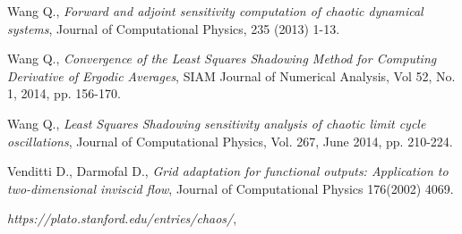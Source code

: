 \documentclass[12pt, twoside]{book}
\begin{document}
\begin{thebibliography}{99}
 Wang Q.,
\emph{Forward and adjoint sensitivity computation of chaotic dynamical systems},
Journal of Computational Physics, 235 (2013) 1-13.

 Wang Q.,
\emph{Convergence of the Least Squares Shadowing Method for Computing Derivative of Ergodic Averages},
SIAM Journal of Numerical Analysis, Vol 52, No. 1, 2014, pp. 156-170.  

 Wang Q., 
\emph{Least Squares Shadowing sensitivity analysis of chaotic limit cycle oscillations},
Journal of Computational Physics, Vol. 267, June 2014, pp. 210-224.  

 Venditti D., Darmofal D.,
\emph{Grid adaptation for functional outputs: Application to two-dimensional inviscid flow},
Journal of Computational Physics 176(2002) 4069.

\emph{https://plato.stanford.edu/entries/chaos/},
\end{thebibliography} 
\end{document}
